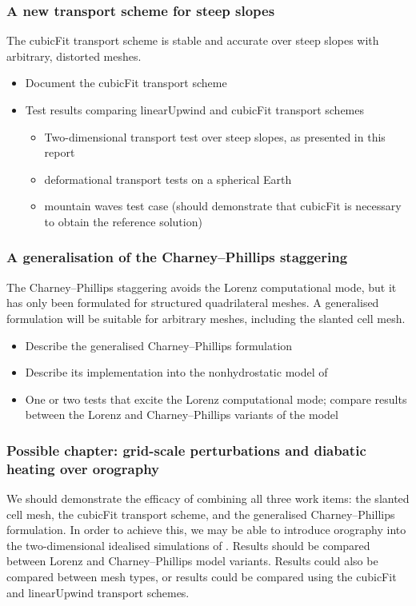 \documentclass[a4paper,11pt]{article}
\begin{document}
\subsubsection*{A new transport scheme for steep slopes}
\noindent The cubicFit transport scheme is stable and accurate over steep slopes with arbitrary, distorted meshes.
\begin{itemize}[itemsep=0.1em]
	\item Document the cubicFit transport scheme
	\item {Test results comparing linearUpwind and cubicFit transport schemes
	\begin{itemize}[itemsep=0.1em,topsep=0pt]
		\item Two-dimensional transport test over steep slopes, as presented in this report
		\item \citet{lauritzen2012} deformational transport tests on a spherical Earth
		\item \citet{schaer2002} mountain waves test case (should demonstrate that cubicFit is necessary to obtain the reference solution)
	\end{itemize}}
\end{itemize}
	
\subsubsection*{A generalisation of the Charney--Phillips staggering}
\noindent The Charney--Phillips staggering avoids the Lorenz computational mode, but it has only been formulated for structured quadrilateral meshes.  A generalised formulation will be suitable for arbitrary meshes, including the slanted cell mesh.
\begin{itemize}[itemsep=0.1em]
	\item Describe the generalised Charney--Phillips formulation
	\item Describe its implementation into the nonhydrostatic model of \citet{weller-shahrokhi2014}
	\item One or two tests that excite the Lorenz computational mode; compare results between the Lorenz and Charney--Phillips variants of the model
\end{itemize}

\subsubsection*{Possible chapter: grid-scale perturbations and diabatic heating over orography}
\noindent We should demonstrate the efficacy of combining all three work items: the slanted cell mesh, the cubicFit transport scheme, and the generalised Charney--Phillips formulation.  In order to achieve this, we may be able to introduce orography into the two-dimensional idealised simulations of \citet{arakawa-konor1996}.
Results should be compared between Lorenz and Charney--Phillips model variants.  Results could also be compared between mesh types, or results could be compared using the cubicFit and linearUpwind transport schemes.
\end{document}
